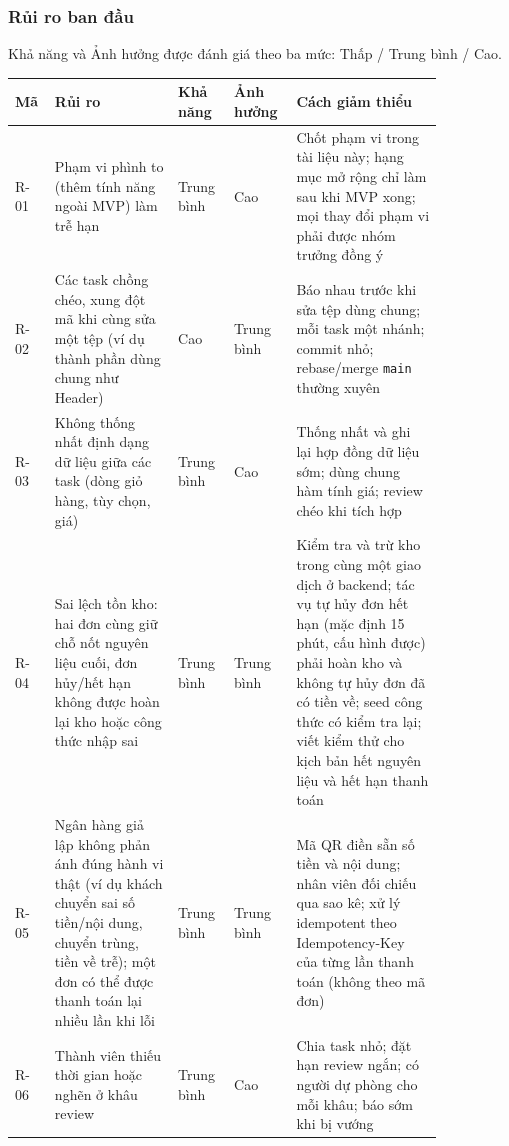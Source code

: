 \subsubsection{Rủi ro ban đầu}

Khả năng và Ảnh hưởng được đánh giá theo ba mức: Thấp / Trung bình / Cao.

{\small\renewcommand{\arraystretch}{1.25}
\begin{longtable}{@{}p{0.06\linewidth}p{0.26\linewidth}p{0.11\linewidth}p{0.11\linewidth}p{0.31\linewidth}@{}}
\toprule
\textbf{Mã} & \textbf{Rủi ro} & \textbf{Khả năng} & \textbf{Ảnh hưởng} & \textbf{Cách giảm thiểu} \\
\midrule
\endhead
\bottomrule
\endfoot
R-01 & Phạm vi phình to (thêm tính năng ngoài MVP) làm trễ hạn & Trung bình & Cao & Chốt phạm vi trong tài liệu này; hạng mục mở rộng chỉ làm sau khi MVP xong; mọi thay đổi phạm vi phải được nhóm trưởng đồng ý \\[4pt]
R-02 & Các task chồng chéo, xung đột mã khi cùng sửa một tệp (ví dụ thành phần dùng chung như Header) & Cao & Trung bình & Báo nhau trước khi sửa tệp dùng chung; mỗi task một nhánh; commit nhỏ; rebase/merge \texttt{main} thường xuyên \\[4pt]
R-03 & Không thống nhất định dạng dữ liệu giữa các task (dòng giỏ hàng, tùy chọn, giá) & Trung bình & Cao & Thống nhất và ghi lại hợp đồng dữ liệu sớm; dùng chung hàm tính giá; review chéo khi tích hợp \\[4pt]
R-04 & Sai lệch tồn kho: hai đơn cùng giữ chỗ nốt nguyên liệu cuối, đơn hủy/hết hạn không được hoàn lại kho hoặc công thức nhập sai & Trung bình & Trung bình & Kiểm tra và trừ kho trong cùng một giao dịch ở backend; tác vụ tự hủy đơn hết hạn (mặc định 15 phút, cấu hình được) phải hoàn kho và không tự hủy đơn đã có tiền về; seed công thức có kiểm tra lại; viết kiểm thử cho kịch bản hết nguyên liệu và hết hạn thanh toán \\[4pt]
R-05 & Ngân hàng giả lập không phản ánh đúng hành vi thật (ví dụ khách chuyển sai số tiền/nội dung, chuyển trùng, tiền về trễ); một đơn có thể được thanh toán lại nhiều lần khi lỗi & Trung bình & Trung bình & Mã QR điền sẵn số tiền và nội dung; nhân viên đối chiếu qua sao kê; xử lý idempotent theo Idempotency-Key của từng lần thanh toán (không theo mã đơn) \\[4pt]
R-06 & Thành viên thiếu thời gian hoặc nghẽn ở khâu review & Trung bình & Cao & Chia task nhỏ; đặt hạn review ngắn; có người dự phòng cho mỗi khâu; báo sớm khi bị vướng \\[4pt]

\end{longtable}}
